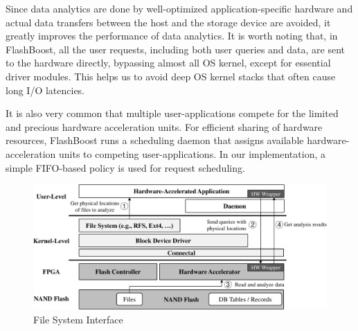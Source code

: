 Since data analytics are done by well-optimized application-specific hardware and 
actual data transfers between the host and the storage device are avoided,
it greatly improves the performance of data analytics.
It is worth noting that, in FlashBoost,
all the user requests, including both user queries and data, are sent to the hardware directly, 
bypassing almost all OS kernel, except for essential driver modules. 
This helps us to avoid deep OS kernel stacks that often cause long I/O latencies. 
 
It is also very common that multiple
user-applications compete for the limited and precious hardware acceleration
units. For efficient sharing of hardware resources, FlashBoost runs a scheduling
daemon that assigns available hardware-acceleration units to competing
user-applications. In our implementation, a simple FIFO-based policy is used for
request scheduling.

\begin{figure}[h]
	\begin{center}
	\includegraphics[width=0.4\paperwidth]{figures/software.pdf}
	\caption{File System Interface}
	\label{fig:filesystem}
	\end{center}
\end{figure}
